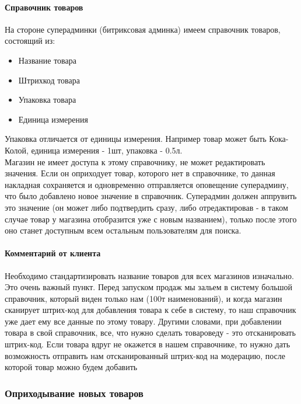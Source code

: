 \documentclass[DIV=calc, paper=a4, fontsize=11pt]{scrartcl} %
\begin{document}
\paragraph{Справочник товаров} \label{new_goods}
На стороне суперадминки (битриксовая админка) имеем справочник товаров, состоящий из:

\begin{itemize}
	\item Название товара
	\item Штрихкод товара
	\item Упаковка товара
	\item Единица измерения
\end{itemize}

Упаковка отличается от единицы измерения. Например товар может быть Кока-Колой, единица измерения - 1шт, упаковка - 0.5л.
\\[0.5cm]
Магазин не имеет доступа к этому справочнику, не может редактировать значения. Если он оприходует товар, которого нет в справочнике, то данная накладная сохраняется и одновременно отправляется оповещение суперадмину, что было добавлено новое значение в справочник. Суперадмин должен аппрувить это значение (он может либо подтвердить сразу, либо отредактировав - в таком случае товар у магазина отобразится уже с новым названием), только после этого оно станет доступным всем остальным пользователям для поиска.

\begin{framed}
\paragraph{Комментарий от клиента}
	Необходимо стандартизировать название товаров для всех магазинов изначально. Это очень важный пункт. Перед запуском продаж мы зальем в систему большой справочник, который виден только нам (100т наименований), и когда магазин сканирует штрих-код для добавления товара к себе в систему, то наш справочник уже дает ему все данные по этому товару. Другими словами, при добавлении товара в свой справочник, все, что нужно сделать товароведу - это отсканировать штрих-код. Если товара вдруг не окажется в нашем справочнике, то нужно дать возможность отправить нам отсканированный штрих-код на модерацию, после которой товар можно будем добавить
\end{framed}


\subsubsection{Оприходывание новых товаров}
\end{document}
